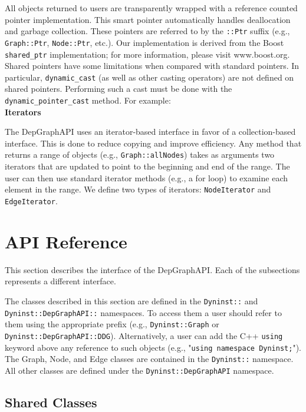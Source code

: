 \documentclass[12pt,titlepage]{article}
\begin{document}
All objects returned to users are transparently wrapped with a
reference counted pointer implementation. This smart pointer
automatically handles deallocation and garbage collection. These
pointers are referred to by the \texttt{::Ptr} suffix (e.g., \texttt{Graph::Ptr},
\texttt{Node::Ptr}, etc.). Our implementation is derived from the Boost
\texttt{shared\_ptr} implementation; for more information, please visit
www.boost.org. Shared pointers have some limitations when compared
with standard pointers. In particular, \texttt{dynamic\_cast} (as well as other
casting operators) are not defined on shared pointers. Performing such
a cast must be done with the \texttt{dynamic\_pointer\_cast}
method. For example:  \\[\baselineskip]
\normalfont\normalsize 
\noindent \textbf{Iterators}

The DepGraphAPI uses an iterator-based interface in favor of a
collection-based interface. This is done to reduce copying and improve
efficiency. Any method that returns a range of objects (e.g.,
\texttt{Graph::allNodes}) takes as arguments two iterators that are updated to
point to the beginning and end of the range. The user can then use
standard iterator methods (e.g., a for loop) to examine each element
in the range. We define two types of iterators: \texttt{NodeIterator} and
\texttt{EdgeIterator}.

\section{API Reference}

This section describes the interface of the DepGraphAPI. Each of the
subsections represents a different interface.

The classes described in this section are defined in the \texttt{Dyninst::} and
\texttt{Dyninst::DepGraphAPI::} namespaces.  To access them a user
should refer to them using the appropriate prefix (e.g.,
\texttt{Dyninst::Graph} or
\texttt{Dyninst::DepGraphAPI::DDG}). Alternatively, a user can add the
C++ \texttt{using} keyword above any reference to such objects (e.g.,
"\texttt{using namespace Dyninst;}").  The Graph, Node, and Edge
classes are contained in the \texttt{Dyninst::} namespace.  All other
classes are defined under the \texttt{Dyninst::DepGraphAPI} namespace.

        
\subsection{Shared Classes}
\end{document}
